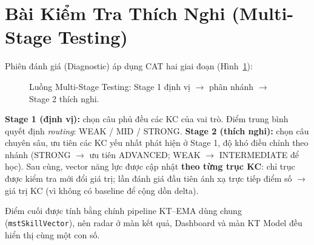 \section{Bài Kiểm Tra Thích Nghi (Multi-Stage Testing)}
\label{sec:mst}

Phiên đánh giá (Diagnostic) áp dụng CAT hai giai đoạn (Hình~\ref{fig:mst}):

\begin{figure}[H]
  \centering
  \caption{Luồng Multi-Stage Testing: Stage 1 định vị $\to$ phân nhánh $\to$ Stage 2 thích nghi.}
  \label{fig:mst}
\end{figure}

\textbf{Stage 1 (định vị):} chọn câu phủ đều các KC của vai trò. Điểm trung bình quyết định \textit{routing}: WEAK / MID / STRONG. \textbf{Stage 2 (thích nghi):} chọn câu chuyên sâu, ưu tiên các KC yếu nhất phát hiện ở Stage 1, độ khó điều chỉnh theo nhánh (STRONG $\to$ ưu tiên ADVANCED; WEAK $\to$ INTERMEDIATE để học). Sau cùng, vector năng lực được cập nhật \textbf{theo từng trục KC}: chỉ trục được kiểm tra mới đổi giá trị; lần đánh giá đầu tiên ánh xạ trực tiếp điểm số $\to$ giá trị KC (vì không có baseline để cộng dồn delta).

Điểm cuối được tính bằng chính pipeline KT--EMA dùng chung (\texttt{mstSkillVector}), nên radar ở màn kết quả, Dashboard và màn KT Model đều hiển thị cùng một con số.

